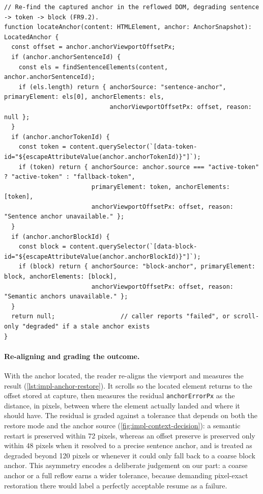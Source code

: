 \begin{listing}[htbp]
\begin{verbatim}
// Re-find the captured anchor in the reflowed DOM, degrading sentence -> token -> block (FR9.2).
function locateAnchor(content: HTMLElement, anchor: AnchorSnapshot): LocatedAnchor {
  const offset = anchor.anchorViewportOffsetPx;
  if (anchor.anchorSentenceId) {
    const els = findSentenceElements(content, anchor.anchorSentenceId);
    if (els.length) return { anchorSource: "sentence-anchor", primaryElement: els[0], anchorElements: els,
                             anchorViewportOffsetPx: offset, reason: null };
  }
  if (anchor.anchorTokenId) {
    const token = content.querySelector(`[data-token-id="${escapeAttributeValue(anchor.anchorTokenId)}"]`);
    if (token) return { anchorSource: anchor.source === "active-token" ? "active-token" : "fallback-token",
                        primaryElement: token, anchorElements: [token],
                        anchorViewportOffsetPx: offset, reason: "Sentence anchor unavailable." };
  }
  if (anchor.anchorBlockId) {
    const block = content.querySelector(`[data-block-id="${escapeAttributeValue(anchor.anchorBlockId)}"]`);
    if (block) return { anchorSource: "block-anchor", primaryElement: block, anchorElements: [block],
                        anchorViewportOffsetPx: offset, reason: "Semantic anchors unavailable." };
  }
  return null;                  // caller reports "failed", or scroll-only "degraded" if a stale anchor exists
}
\end{verbatim}
\caption{Re-locating the anchor after the reflow (abbreviated from \texttt{usePreserveReadingContext.ts}): offset-preserve degrades sentence → token → block; semantic-restart re-locates that captured anchor first and falls back to \texttt{locateSemanticRestartAnchor} only if it is gone; null yields the failed or degraded outcome (\cref{fig:impl-context-decision}).}
\label{lst:impl-anchor-locate}
\end{listing}

\paragraph{Re-aligning and grading the outcome.}
With the anchor located, the reader re-aligns the viewport and measures the result (\cref{lst:impl-anchor-restore}).
It scrolls so the located element returns to the offset stored at capture, then measures the residual \texttt{anchorErrorPx} as the distance, in pixels, between where the element actually landed and where it should have.
The residual is graded against a tolerance that depends on both the restore mode and the anchor source (\cref{fig:impl-context-decision}): a semantic restart is preserved within 72 pixels, whereas an offset preserve is preserved only within 48 pixels when it resolved to a precise sentence anchor, and is treated as degraded beyond 120 pixels or whenever it could only fall back to a coarse block anchor.
This asymmetry encodes a deliberate judgement on our part: a coarse anchor or a full reflow earns a wider tolerance, because demanding pixel-exact restoration there would label a perfectly acceptable resume as a failure.


